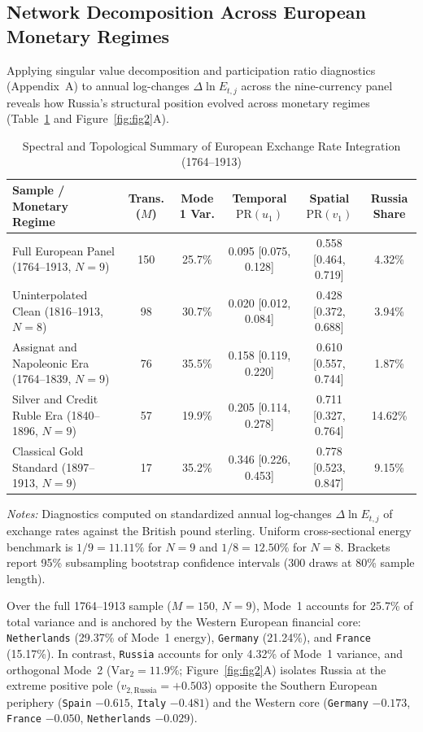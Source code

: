 \documentclass[11pt,a4paper]{article}
\begin{document}
\subsection{Network Decomposition Across European Monetary Regimes}
Applying singular value decomposition and participation ratio diagnostics (Appendix~A) to annual log-changes $\Delta \ln E_{t,j}$ across the nine-currency panel reveals how Russia's structural position evolved across monetary regimes (Table~\ref{tab:fx_summary} and Figure~\ref{fig:fig2}A).

\begin{table}[htbp]
\centering
\caption{Spectral and Topological Summary of European Exchange Rate Integration (1764--1913)}
\label{tab:fx_summary}
\footnotesize
\setlength{\tabcolsep}{4.2pt}
\begin{tabular}{lccccc}
\toprule
\textbf{Sample / Monetary Regime} & \textbf{Trans. ($M$)} & \textbf{Mode 1 Var.} & \textbf{Temporal $\mathrm{PR}(u_1)$} & \textbf{Spatial $\mathrm{PR}(v_1)$} & \textbf{Russia Share} \tabularnewline
\midrule
Full European Panel (1764--1913, $N=9$) & 150 & 25.7\% & 0.095 [0.075, 0.128] & 0.558 [0.464, 0.719] & 4.32\% \tabularnewline
Uninterpolated Clean (1816--1913, $N=8$) & 98 & 30.7\% & 0.020 [0.012, 0.084] & 0.428 [0.372, 0.688] & 3.94\% \tabularnewline
Assignat and Napoleonic Era (1764--1839, $N=9$) & 76 & 35.5\% & 0.158 [0.119, 0.220] & 0.610 [0.557, 0.744] & 1.87\% \tabularnewline
Silver and Credit Ruble Era (1840--1896, $N=9$) & 57 & 19.9\% & 0.205 [0.114, 0.278] & 0.711 [0.327, 0.764] & 14.62\% \tabularnewline
Classical Gold Standard (1897--1913, $N=9$) & 17 & 35.2\% & 0.346 [0.226, 0.453] & 0.778 [0.523, 0.847] & 9.15\% \tabularnewline
\bottomrule
\end{tabular}
\vspace{1mm}
\begin{minipage}{\textwidth}
\footnotesize\emph{Notes:} Diagnostics computed on standardized annual log-changes $\Delta \ln E_{t,j}$ of exchange rates against the British pound sterling. Uniform cross-sectional energy benchmark is $1/9 = 11.11\%$ for $N=9$ and $1/8 = 12.50\%$ for $N=8$. Brackets report 95\% subsampling bootstrap confidence intervals (300 draws at 80\% sample length).
\end{minipage}
\end{table}

Over the full 1764--1913 sample ($M = 150$, $N=9$), Mode~1 accounts for 25.7\% of total variance and is anchored by the Western European financial core: \texttt{Netherlands} (29.37\% of Mode~1 energy), \texttt{Germany} (21.24\%), and \texttt{France} (15.17\%). In contrast, \texttt{Russia} accounts for only 4.32\% of Mode~1 variance, and orthogonal Mode~2 ($\mathrm{Var}_2 = 11.9\%$; Figure~\ref{fig:fig2}A) isolates Russia at the extreme positive pole ($v_{2,\mathrm{Russia}} = +0.503$) opposite the Southern European periphery (\texttt{Spain} $-0.615$, \texttt{Italy} $-0.481$) and the Western core (\texttt{Germany} $-0.173$, \texttt{France} $-0.050$, \texttt{Netherlands} $-0.029$).
\end{document}
